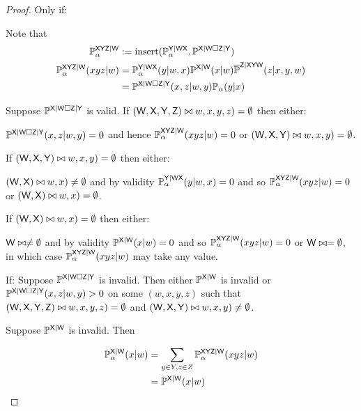 \begin{proof}
Only if:

Note that
\begin{align}
	\prob{P}_\alpha^{\RV{XYZ}|\RV{W}}&:=\text{insert}(\prob{P}_\alpha^{\RV{Y}|\RV{WX}},\prob{P}^{\RV{X}|\RV{W}\square\RV{Z}|\RV{Y}})\\
	\prob{P}_\alpha^{\RV{XYZ}|\RV{W}}(xyz|w) &= \prob{P}^{\RV{Y}|\RV{WX}}_\alpha(y|w,x)\prob{P}^{\RV{X}|\RV{W}}(x|w)\disint{P}^{\RV{Z}|\RV{XYW}}(z|x,y,w)\\
	&= \prob{P}^{\RV{X}|\RV{W}\square\RV{Z}|\RV{Y}}(x,z|w,y)\prob{P}_\alpha(y|x)
\end{align}

Suppose $\prob{P}^{\RV{X}|\RV{W}\square\RV{Z}|\RV{Y}}$ is valid. If $(\RV{W},\RV{X},\RV{Y},\RV{Z})\yields(w,x,y,z)=\emptyset$ then either:

$\prob{P}^{\RV{X}|\RV{W}\square\RV{Z}|\RV{Y}}(x,z|w,y)=0$ and hence $\prob{P}_\alpha^{\RV{XYZ}|\RV{W}}(xyz|w)=0$ or $(\RV{W},\RV{X},\RV{Y})\yields(w,x,y)=\emptyset$.

If $(\RV{W},\RV{X},\RV{Y})\yields(w,x,y)=\emptyset$ then either:

$(\RV{W},\RV{X})\yields (w,x)\neq\emptyset$ and by validity $\prob{P}^{\RV{Y}|\RV{WX}}_\alpha(y|w,x)=0$ and so $\prob{P}_\alpha^{\RV{XYZ}|\RV{W}}(xyz|w)=0$ or $(\RV{W},\RV{X})\yields(w,x)=\emptyset$.

If $(\RV{W},\RV{X})\yields(w,x)=\emptyset$ then either:

$\RV{W}\yields w\neq \emptyset$ and by validity $\prob{P}^{\RV{X}|\RV{W}}(x|w)=0$ and so $\prob{P}_\alpha^{\RV{XYZ}|\RV{W}}(xyz|w)=0$ or $\RV{W}\yields w=\emptyset$, in which case $\prob{P}_\alpha^{\RV{XYZ}|\RV{W}}(xyz|w)$ may take any value.

If:
Suppose $\prob{P}^{\RV{X}|\RV{W}\square\RV{Z}|\RV{Y}}$ is invalid. Then either $\prob{P}^{\RV{X}|\RV{W}}$ is invalid or $\prob{P}^{\RV{X}|\RV{W}\square\RV{Z}|\RV{Y}}(x,z|w,y)>0$ on some $(w,x,y,z)$ such that $(\RV{W},\RV{X},\RV{Y},\RV{Z})\yields(w,x,y,z)= \emptyset$ and $(\RV{W},\RV{X},\RV{Y})\yields(w,x,y)\neq \emptyset$.

Suppose $\prob{P}^{\RV{X}|\RV{W}}$ is invalid. Then

\begin{align}
	\prob{P}_\alpha^{\RV{X}|\RV{W}}(x|w) &= \sum_{y\in Y,z\in Z}\prob{P}_\alpha^{\RV{XYZ}|\RV{W}}(xyz|w)\\
										 &= \prob{P}^{\RV{X}|\RV{W}}(x|w)
\end{align}


\end{proof}
